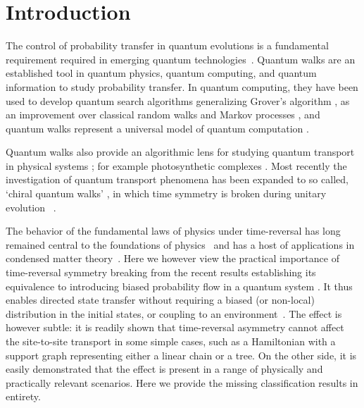 \documentclass[twocolumn,superscriptaddress]{revtex4-1}
\theoremstyle{plain}
\theoremstyle{definition}
\theoremstyle{definition}
\theoremstyle{definition}
\theoremstyle{definition}
\theoremstyle{definition}
\theoremstyle{definition}
\begin{document}
\maketitle 
\section{Introduction}
The control of probability transfer in quantum evolutions is a fundamental requirement required in emerging quantum technologies~\cite{Lanyon2010towards, nv_opt2013}.  Quantum walks \cite{kempe2003quantum,venegas2012quantum} are an established tool in quantum physics, quantum computing, and quantum information to study probability transfer. In quantum computing, they have been used to develop quantum search algorithms generalizing Grover's algorithm \cite{wong2015faster,wong2015grover,shenvi2003quantum,krovi2015quantum,childs2004spatial}, as an improvement over classical random walks and Markov processes \cite{moore2002quantum,childs2003exponential,szegedy2004quantum}, and quantum walks represent a universal model of quantum computation \cite{childs2009universal}.

Quantum walks also provide an algorithmic lens for studying quantum transport in physical systems \cite{mulken2011continuous,mulken2006coherent}; for example photosynthetic complexes \cite{mohseni2008environment,rebentrost2009environment}.  Most recently the investigation of quantum transport phenomena has been expanded to so called, `chiral quantum walks' \cite{Z13}, in which time symmetry is broken during unitary evolution ~\cite{Z13,xiang2013transfer,bedkihal2013transfer,manzano2013transfer, Wong15, cameron2013transfer}.  

The behavior of the fundamental laws of physics under time-reversal has long
remained central to the foundations of
physics~\cite{wigner59,2013PhRvL.111b0504S} and has a host of applications in condensed
matter theory~\cite{peierls1993,hofstadter1976energy,sarma2008hall,
hasan2010topological,dalibard2011artificial}. Here we however view the practical importance of time-reversal symmetry breaking 
from the recent results establishing its equivalence to introducing
biased probability flow in a quantum system \cite{Z13}. It thus enables directed state transfer
without requiring a biased (or non-local) distribution in the initial states, or coupling to an
environment~\cite{Z13,plenio2008dephasing, 2012PhRvL.108b0602S, Bose07}.  The effect is however subtle:  it is readily shown that time-reversal asymmetry cannot affect the site-to-site transport in some simple cases, such as a Hamiltonian with a support graph representing either a linear chain or a tree.  
On the other side, it is easily demonstrated that the effect is present in a range of physically and practically relevant scenarios.  Here we provide the missing classification results in entirety.  
\end{document}
